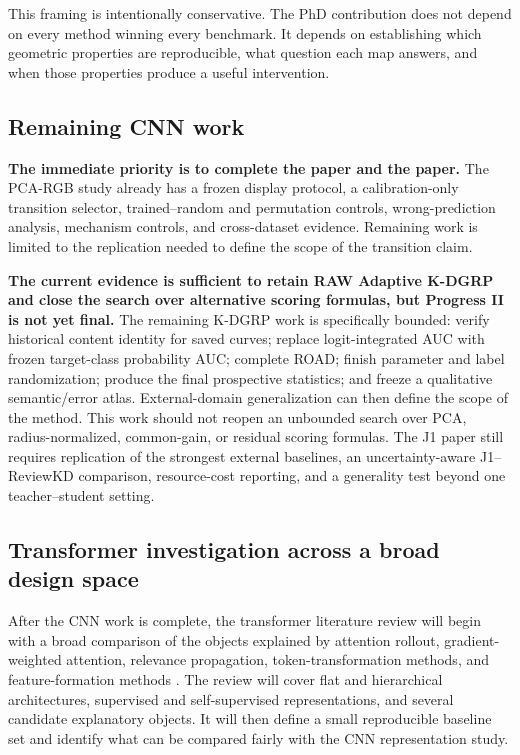 This framing is intentionally conservative. The PhD contribution does not
depend on every method winning every benchmark. It depends on establishing
which geometric properties are reproducible, what question each map answers,
and when those properties produce a useful intervention.

\subsection{Remaining CNN work}

\textbf{The immediate priority is to complete the \methodname{} paper and the
\jmethod{} paper.} The PCA-RGB study already has a frozen display protocol, a
calibration-only transition selector, trained--random and permutation controls,
wrong-prediction analysis, mechanism controls, and cross-dataset evidence.
Remaining work is limited to the replication needed to define the scope of the
transition claim.

\textbf{The current evidence is sufficient to retain RAW Adaptive K-DGRP and
close the search over alternative scoring formulas, but Progress II is not yet
final.} The remaining K-DGRP work is specifically bounded: verify historical
content identity for saved curves; replace logit-integrated AUC with frozen
target-class probability AUC; complete ROAD; finish parameter and label
randomization; produce the final prospective statistics; and freeze a
qualitative semantic/error atlas. External-domain generalization can then
define the scope of the method. This work should not reopen an unbounded search
over PCA, radius-normalized, common-gain, or residual scoring formulas. The J1
paper still requires replication of the strongest external baselines, an
uncertainty-aware J1--ReviewKD comparison, resource-cost reporting, and a
generality test beyond one teacher--student setting.

\subsection{Transformer investigation across a broad design space}

After the CNN work is complete, the transformer literature review will begin
with a broad comparison of the objects explained by attention rollout,
gradient-weighted attention, relevance propagation, token-transformation
methods, and feature-formation methods
\cite{abnar2020attentionflow,chefer2021transformer,
xie2023vitcx,wu2024tokentm,mehri2025libragrad,bousselham2025legrad}. The review
will cover flat and hierarchical architectures, supervised and self-supervised
representations, and several candidate explanatory objects. It will then define
a small reproducible baseline set and identify what can be compared fairly with
the CNN representation study.

